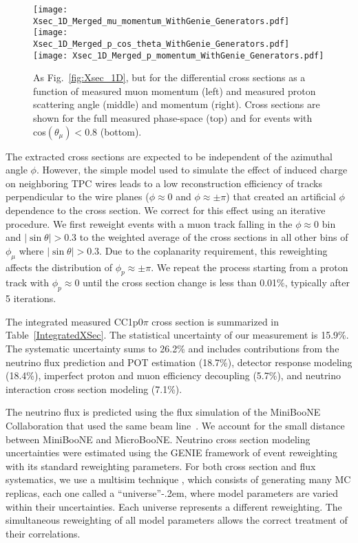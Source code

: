 \documentclass[aps,prl,showpacs,twocolumn,superscriptaddress,letterpaper,longbibliography]{revtex4-1}
\newcommand{\uB}{MicroBooNE}
\begin{document}
	    \begin{figure*}[t]
		\centering  
		\texttt{[image: Xsec\_1D\_Merged\_mu\_momentum\_WithGenie\_Generators.pdf]}
		\texttt{[image: Xsec\_1D\_Merged\_p\_cos\_theta\_WithGenie\_Generators.pdf]}		
		\texttt{[image: Xsec\_1D\_Merged\_p\_momentum\_WithGenie\_Generators.pdf]}
		\caption{As Fig.~\ref{fig:Xsec_1D},  but for the differential cross sections as a function of measured muon momentum (left) and measured proton scattering angle (middle) 
		and momentum (right). 
		Cross sections are shown for the full measured phase-space (top) and for events with cos$(\theta_\mu) < 0.8$ (bottom).}
		\label{fig:Xsec_1D_without_last_bin}
	\end{figure*}




The extracted cross sections are expected to be independent of the azimuthal angle $\phi$. 
However, the simple model used to simulate the effect of induced charge on neighboring TPC wires leads to a low reconstruction efficiency of tracks perpendicular to the wire planes 
($\phi \approx 0$ and $\phi \approx \pm\pi$) that created an artificial $\phi$ dependence to the cross section. 
We correct for this effect using an iterative procedure. We first reweight events with a muon track falling in the $\phi \approx 0$ bin and $|\sin\theta|>0.3$ to the weighted 
average of the cross sections in all other bins of $\phi_{\mu}$ where  $|\sin\theta|>0.3$. Due to the coplanarity requirement, this reweighting affects the 
distribution of $\phi_{p} \approx \pm \pi$. We repeat the process starting from a proton track with $\phi_{p} \approx 0$ until the cross section change is less than 0.01$\%$, 
typically after 5 iterations. 







The integrated measured CC1p0$\pi$ cross section is summarized in Table~\ref{IntegratedXSec}. 
The statistical uncertainty of our measurement is 15.9\%.
The systematic uncertainty sums to 26.2\%
and includes contributions from the neutrino flux prediction and POT estimation (18.7\%),
detector response modeling (18.4\%),
imperfect proton and muon efficiency decoupling (5.7\%), 
and neutrino interaction cross section modeling (7.1\%).



The neutrino flux is predicted using the flux simulation of the MiniBooNE Collaboration that used the same beam line~\cite{Aguilar-Arevalo:2013dva}. We account for the small distance 
between 
MiniBooNE and \uB.
Neutrino  cross  section  modeling uncertainties were estimated using the GENIE framework of event reweighting \cite{Andreopoulos:2009rq,Andreopoulos:2015wxa} with its standard reweighting 
parameters.  
For both cross section and 
flux systematics, we use a multisim technique \cite{Roe:2007hw},  which  consists  of  generating many MC replicas, each one called a ``universe''\kern-.2em, where model parameters are varied 
within their uncertainties. Each universe represents a different reweighting. The simultaneous reweighting of all model parameters allows the correct treatment of their correlations.
\end{document}
